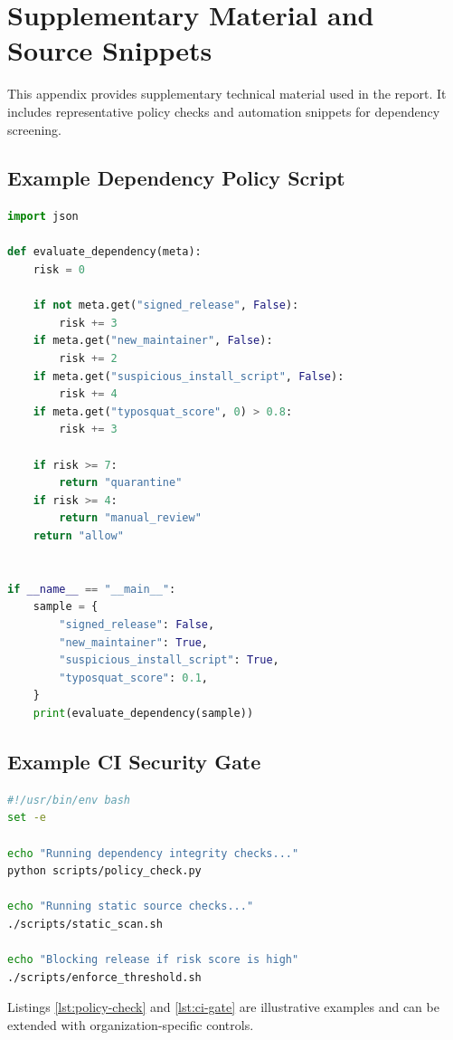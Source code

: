 \chapter{Supplementary Material and Source Snippets}
\label{app:supplementary}

This appendix provides supplementary technical material used in the report.
It includes representative policy checks and automation snippets for dependency screening.

\section{Example Dependency Policy Script}

\begin{lstlisting}[language=Python,caption={Illustrative policy checks for dependency metadata.},label={lst:policy-check}]
import json

def evaluate_dependency(meta):
	risk = 0

	if not meta.get("signed_release", False):
		risk += 3
	if meta.get("new_maintainer", False):
		risk += 2
	if meta.get("suspicious_install_script", False):
		risk += 4
	if meta.get("typosquat_score", 0) > 0.8:
		risk += 3

	if risk >= 7:
		return "quarantine"
	if risk >= 4:
		return "manual_review"
	return "allow"


if __name__ == "__main__":
	sample = {
		"signed_release": False,
		"new_maintainer": True,
		"suspicious_install_script": True,
		"typosquat_score": 0.1,
	}
	print(evaluate_dependency(sample))
\end{lstlisting}

\section{Example CI Security Gate}

\begin{lstlisting}[language=bash,caption={Illustrative CI gate for dependency updates.},label={lst:ci-gate}]
#!/usr/bin/env bash
set -e

echo "Running dependency integrity checks..."
python scripts/policy_check.py

echo "Running static source checks..."
./scripts/static_scan.sh

echo "Blocking release if risk score is high"
./scripts/enforce_threshold.sh
\end{lstlisting}

Listings \ref{lst:policy-check} and \ref{lst:ci-gate} are illustrative examples and can be
extended with organization-specific controls.

